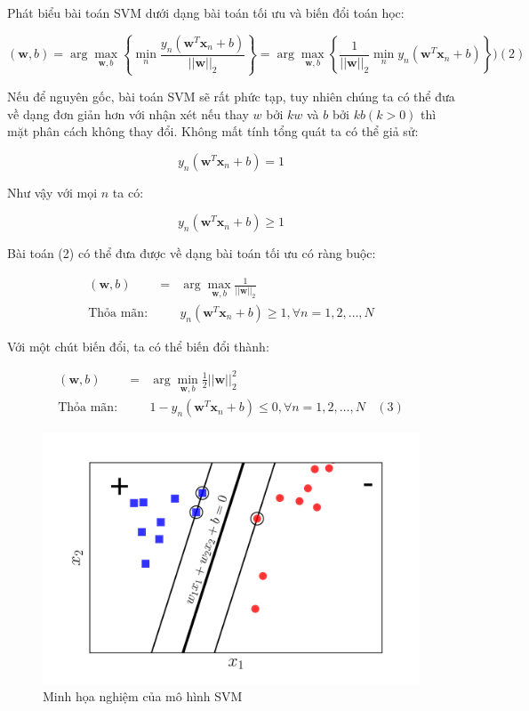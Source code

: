 \documentclass[a4paper, 12pt, oneside]{report}
\begin{document}
Phát biểu bài toán SVM dưới dạng bài toán tối ưu và biến đổi toán học: 
\begin{mybox} $$
(\mathbf{w}, b) = \arg\max_{\mathbf{w}, b} \left\{
    \min_{n} \frac{y_n(\mathbf{w}^T\mathbf{x}_n + b)}{||\mathbf{w}||_2} 
\right\}
= \arg\max_{\mathbf{w}, b}\left\{
    \frac{1}{||\mathbf{w}||_2} \min_{n} y_n(\mathbf{w}^T\mathbf{x}_n + b)
\right\} )(2)$$  \end{mybox}
Nếu để nguyên gốc, bài toán SVM sẽ rất phức tạp, tuy nhiên chúng ta có thể đưa về dạng đơn giản hơn với nhận xét nếu thay $w$ bởi $kw$ và $b$ bởi $kb (k>0)$  thì mặt phân cách không thay đổi. Không mất tính tổng quát ta có thể giả sử: 
\begin{mybox} $$y_n(\mathbf{w}^T\mathbf{x}_n + b) = 1$$ \end{mybox}
Như vậy với mọi $n$ ta có: \\
\begin{mybox}
$$y_n(\mathbf{w}^T\mathbf{x}_n + b) \geq 1$$ \end{mybox}
Bài toán (2) có thể đưa được về dạng bài toán tối ưu có ràng buộc: 
\begin{mybox}
\begin{eqnarray}
    (\mathbf{w}, b) &=& \arg \max_{\mathbf{w}, b} \frac{1}{||\mathbf{w}||_2}   \\
    \text{Thỏa mãn:}~ && y_n(\mathbf{w}^T\mathbf{x}_n + b) \geq 1, \forall n = 1, 2, \dots, N 
\end{eqnarray} \end{mybox}
Với một chút biến đổi, ta có thể biến đổi thành: 
\begin{mybox}
\begin{eqnarray}
    (\mathbf{w}, b) &=& \arg \min_{\mathbf{w}, b} \frac{1}{2}||\mathbf{w}||_2^2   \\
    \text{Thỏa mãn:}~ && 1 - y_n(\mathbf{w}^T\mathbf{x}_n + b) \leq 0, \forall n = 1, 2, \dots, N ~~~~ (3)
\end{eqnarray}
\end{mybox}
 \begin{center}
    \begin{figure}[H]
    \begin{center}
     \includegraphics[scale=0.07]{svm6.png}
    \end{center}
    \caption{Minh họa nghiệm của mô hình SVM}
    \label{refhinh1}
    \end{figure}
\end{center} 
\end{document}
